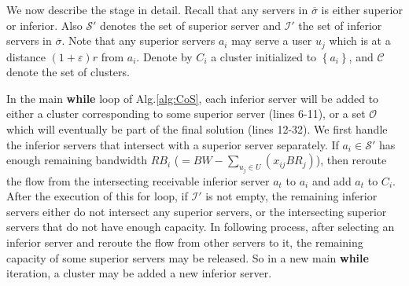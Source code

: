 \documentclass[journal]{IEEEtran}
\begin{document}
We now describe the stage in detail. Recall that any servers in $\overline{\sigma}$ is either superior or inferior. Also $\mathcal{S}'$ denotes the set of superior server and $\mathcal{I}'$ the set of inferior servers in $\overline{\sigma}$. Note that any superior servers $a_i$ may serve a user $u_j$ which is at a distance $(1+\varepsilon)r$ from $a_i$. Denote by $C_i$ a cluster initialized to $\left\{a_i\right\}$, and $\mathcal{C}$ denote the set of clusters.


In the main \textbf{while} loop of Alg.\ref{alg:CoS}, each inferior server will be added to either a cluster corresponding to some superior server (lines 6-11), or a set  $\mathcal{O}$ which will eventually be part of the final solution (lines 12-32). 
We first handle the inferior servers that intersect with a superior server separately. If $a_i \in \mathcal{S}'$ has enough remaining bandwidth $RB_i$ ($=BW-\sum\nolimits_{u_j \in U}{(x_{ij}BR_j)}$), then reroute the flow from the intersecting receivable inferior server $a_t$ to $a_i$ and add $a_t$ to $C_i$. After the execution of this for loop, if $\mathcal{I}'$ is not empty, the remaining inferior servers either do not intersect any superior servers, or the intersecting superior servers that do not have enough capacity. In following process, after selecting an inferior server and reroute the flow from other servers to it, the remaining capacity of some superior servers may be released. So in a new main \textbf{while} iteration, a cluster may be added a new inferior server.
\end{document}
